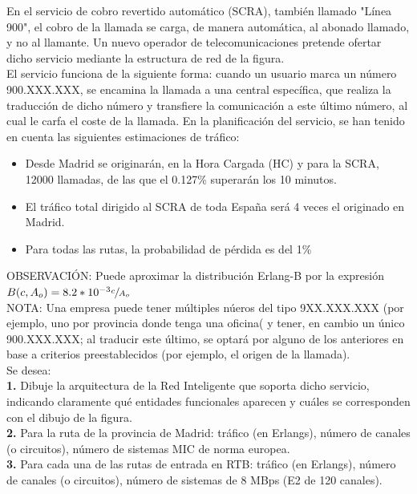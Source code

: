 \begin{exercise}[8]
En el servicio de cobro revertido automático (SCRA), también llamado "Línea 900", el cobro de la llamada se carga, de manera automática, al abonado llamado, y no al llamante. Un nuevo operador de telecomunicaciones pretende ofertar dicho servicio mediante la estructura de red de la figura.\\
El servicio funciona de la siguiente forma: cuando un usuario marca un número 900.XXX.XXX, se encamina la llamada a una central específica, que realiza la traducción de dicho número y transfiere la comunicación a este último número, al cual le carfa el coste de la llamada. En la planificación del servicio, se han tenido en cuenta las siguientes estimaciones de tráfico:
\begin{itemize}
\item Desde Madrid se originarán, en la Hora Cargada (HC) y para la SCRA, 12000 llamadas, de las que el 0.127\% superarán los 10 minutos.
\item El tráfico total dirigido al SCRA de toda España será 4 veces el originado en Madrid.
\item Para todas las rutas, la probabilidad de pérdida es del 1\%
\end{itemize}
OBSERVACIÓN: Puede aproximar la distribución Erlang-B por la expresión $B(c,A_o)=8.2*10^{-3}\sfrac{c}{A_o}$\\
NOTA: Una empresa puede tener múltiples núeros del tipo 9XX.XXX.XXX (por ejemplo, uno por provincia donde tenga una oficina( y tener, en cambio un único 900.XXX.XXX; al traducir este último, se optará por alguno de los anteriores en base a criterios preestablecidos (por ejemplo, el origen de la llamada).\\
Se desea:\\
\textbf{1.} Dibuje la arquitectura de la Red Inteligente que soporta dicho servicio, indicando claramente qué entidades funcionales aparecen y cuáles se corresponden con el dibujo de la figura.\\

\textbf{2.} Para la ruta de la provincia de Madrid: tráfico (en Erlangs), número de canales (o circuitos), número de sistemas MIC de norma europea.\\

\textbf{3.} Para cada una de las rutas de entrada en RTB: tráfico (en Erlangs), número de canales (o circuitos), número de sistemas de 8 MBps (E2 de 120 canales).\\
\end{exercise}
